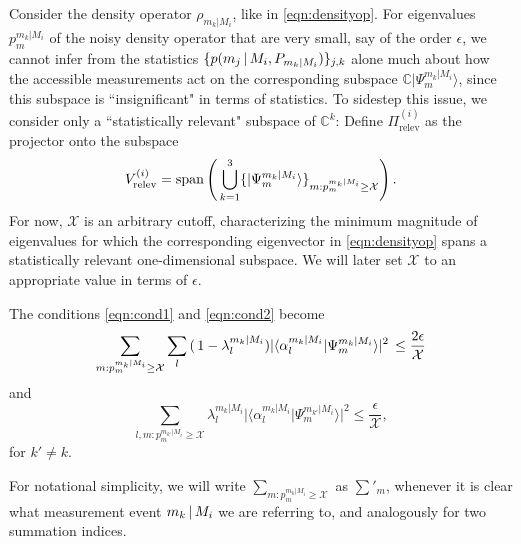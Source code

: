Consider the density operator $\rho_{m_k\vert M_i}$, like in \ref{eqn:densityop}. For eigenvalues $p_m^{m_k\vert M_i}$ of the noisy density operator that are very small, say of the order $\epsilon$, we cannot infer from the statistics $\{p(m_j\thinspace\vert\thinspace M_i, P_{m_k\vert M_i})\}_{j,k}$ alone much about how the accessible measurements act on the corresponding subspace $\mathbb{C}\vert \Psi_m^{m_k\vert M_i}\rangle$, since this subspace is ``insignificant" in terms of statistics. To sidestep this issue, we consider only a ``statistically relevant" subspace of $\mathbb{C}^k$:
Define $\Pi_{\text{relev}}^{(i)}$ as the projector onto the subspace 
\begin{equation}
\label{eqn:relevsubspace}
V_{\text{relev}}^{(i)}=\operatorname{span}\left(\thinspace\bigcup_{k=1}^3\{\vert \Psi_m^{m_k\vert M_i}\rangle\}_{m:p_m^{m_k\vert M_i}\geq\mathcal{X}}\right).
\end{equation}
For now, $\mathcal{X}$ is an arbitrary cutoff, characterizing the minimum magnitude of eigenvalues for which the corresponding eigenvector in \ref{eqn:densityop} spans a statistically relevant one-dimensional subspace. We will later set $\mathcal{X}$ to an appropriate value in terms of $\epsilon$. 

The conditions \ref{eqn:cond1} and \ref{eqn:cond2} become
\begin{equation}
\label{eqn:cond1new}
\sum_{m:p_m^{m_k\vert M_i}\geq \mathcal{X}} \sum_l \,(\thinspace 1- \lambda_l^{m_k\vert M_i}) \vert \langle \alpha_l^{m_k\vert M_i}\vert \Psi_m^{m_k\vert M_i} \rangle \vert^2\thinspace \leq \frac{2\epsilon}{\mathcal{X}}
\end{equation}
and
\begin{equation}
\label{eqn:cond2new}
\sum_{l,m:p_m^{m_{k'}\vert M_i}\geq \mathcal{X}} \lambda_l^{m_k\vert M_i} \vert \langle \alpha_l^{m_k\vert M_i}\vert \Psi_m^{m_{k'}\vert M_i} \rangle \vert^2\leq \frac{\epsilon}{\mathcal{X}},
\end{equation}
for $k'\neq k$.

For notational simplicity, we will write $\sum_{m:p_m^{m_k\vert M_i}\geq \mathcal{X}}$ as $\sum'_m$, whenever it is clear what measurement event $m_k\thinspace\vert\thinspace M_i$ we are referring to, and analogously for two summation indices.

